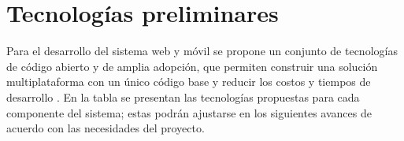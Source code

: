 
\section{Tecnolog\'ias preliminares}

Para el desarrollo del sistema web y m\'ovil se propone un conjunto de
tecnolog\'ias de c\'odigo abierto y de amplia adopci\'on, que permiten construir
una soluci\'on multiplataforma con un \'unico c\'odigo base y reducir los costos y
tiempos de desarrollo \citep{pressman2010}. En la tabla se presentan las
tecnolog\'ias propuestas para cada componente del sistema; estas podr\'an
ajustarse en los siguientes avances de acuerdo con las necesidades del
proyecto.

